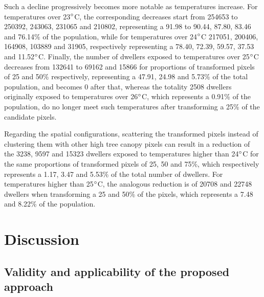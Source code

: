 \documentclass[10pt,letterpaper]{article}
\begin{document}
Such a decline progressively becomes more notable as temperatures increase.
For temperatures over 23$\degree$C, the corresponding decreases start from 254653 to 250392, 243063, 231065 and 210802, representing a 91.98 to 90.44, 87.80, 83.46 and 76.14\% of the population, while for temperatures over 24$\degree$C 217051, 200406, 164908, 103889 and 31905, respectively representing a 78.40, 72.39, 59.57, 37.53 and 11.52$\degree$C.
Finally, the number of dwellers exposed to temperatures over 25$\degree$C decreases from 132641 to 69162 and 15866 for proportions of transformed pixels of 25 and 50\% respectively, representing a 47.91, 24.98 and 5.73\% of the total population, and becomes 0 after that, whereas the totality 2508 dwellers originally exposed to temperatures over 26$\degree$C, which represents a 0.91\% of the population, do no longer meet such temperatures after transforming a 25\% of the candidate pixels.

Regarding the spatial configurations, scattering the transformed pixels instead of clustering them with other high tree canopy pixels can result in a reduction of the 3238, 9597 and 15323 dwellers exposed to temperatures higher than 24$\degree$C for the same proportions of transformed pixels of 25, 50 and 75\%, which respectively represents a 1.17, 3.47 and 5.53\% of the total number of dwellers. For temperatures higher than 25$\degree$C, the analogous reduction is of 20708 and 22748 dwellers when transforming a 25 and 50\% of the pixels, which represents a 7.48 and 8.22\% of the population.


\section*{Discussion}

\subsection*{Validity and applicability of the proposed approach}
\end{document}
